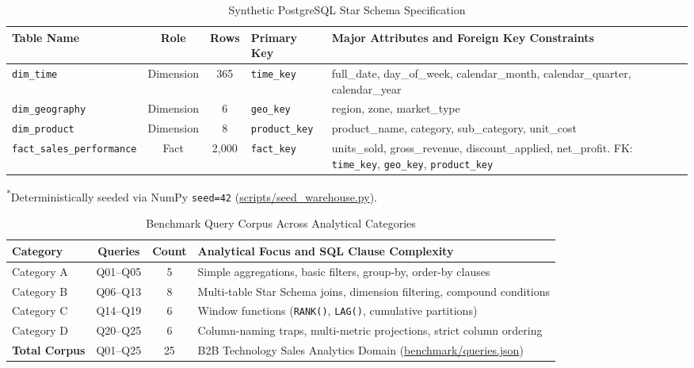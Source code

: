 \begin{table}[t]
\centering
\caption{Synthetic PostgreSQL Star Schema Specification}
\label{tab:schema}
\footnotesize
\setlength{\tabcolsep}{5pt}
\renewcommand{\arraystretch}{1.03}
\begin{tabularx}{\textwidth}{@{}l c c l >{\raggedright\arraybackslash}X@{}}
\toprule
\textbf{Table Name} & \textbf{Role} & \textbf{Rows} & \textbf{Primary Key} & \textbf{Major Attributes and Foreign Key Constraints} \\
\midrule
\texttt{dim\_time} & Dimension & 365 & \texttt{time\_key} & full\_date, day\_of\_week, calendar\_month, calendar\_quarter, calendar\_year \\
\texttt{dim\_geography} & Dimension & 6 & \texttt{geo\_key} & region, zone, market\_type \\
\texttt{dim\_product} & Dimension & 8 & \texttt{product\_key} & product\_name, category, sub\_category, unit\_cost \\
\texttt{fact\_sales\_performance} & Fact & 2,000 & \texttt{fact\_key} & units\_sold, gross\_revenue, discount\_applied, net\_profit. \newline FK: \texttt{time\_key}, \texttt{geo\_key}, \texttt{product\_key} \\
\bottomrule
\end{tabularx}
\vspace{2.0pt}
\begin{minipage}{\textwidth}
\footnotesize \textsuperscript{*}Deterministically seeded via NumPy \texttt{seed=42} (\url{scripts/seed_warehouse.py}).
\end{minipage}
\end{table}

\begin{table}[t]
\centering
\caption{Benchmark Query Corpus Across Analytical Categories}
\label{tab:query_corpus}
\footnotesize
\setlength{\tabcolsep}{3pt}
\renewcommand{\arraystretch}{1.03}
\begin{tabularx}{\columnwidth}{@{}l c c >{\raggedright\arraybackslash}X@{}}
\toprule
\textbf{Category} & \textbf{Queries} & \textbf{Count} & \textbf{Analytical Focus and SQL Clause Complexity} \\
\midrule
Category A & Q01--Q05 & 5 & Simple aggregations, basic filters, group-by, order-by clauses \\
Category B & Q06--Q13 & 8 & Multi-table Star Schema joins, dimension filtering, compound conditions \\
Category C & Q14--Q19 & 6 & Window functions (\texttt{RANK()}, \texttt{LAG()}, cumulative partitions) \\
Category D & Q20--Q25 & 6 & Column-naming traps, multi-metric projections, strict column ordering \\
\midrule
\textbf{Total Corpus} & Q01--Q25 & 25 & B2B Technology Sales Analytics Domain (\url{benchmark/queries.json}) \\
\bottomrule
\end{tabularx}
\end{table}

